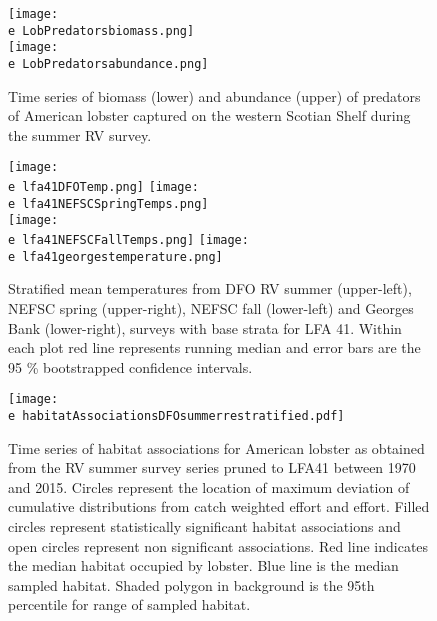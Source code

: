 \documentclass[11pt]{article}
\newcommand{\e}{/backup/bio_data/bio.lobster/figures/} %
\begin{document}

\begin{figure}
\centering
    \texttt{[image: \\e LobPredatorsbiomass.png]}\\
    \texttt{[image: \\e LobPredatorsabundance.png]}\\
    \caption{Time series of biomass (lower) and abundance (upper) of predators of American lobster captured on the western Scotian Shelf during the summer RV survey.}

\end{figure}


\begin{figure}

    \texttt{[image: \\e lfa41DFOTemp.png]}
    \texttt{[image: \\e lfa41NEFSCSpringTemps.png]}\\
    \texttt{[image: \\e lfa41NEFSCFallTemps.png]}
    \texttt{[image: \\e lfa41georgestemperature.png]}\\
   
    \caption{Stratified mean temperatures from DFO RV summer (upper-left), NEFSC spring (upper-right), NEFSC fall (lower-left) and Georges Bank (lower-right), surveys with base strata for LFA 41. Within each plot red line represents running median and error bars are the 95 \% bootstrapped confidence intervals.}

\end{figure}




\begin{figure}

    \texttt{[image: \\e habitatAssociationsDFOsummerrestratified.pdf]}
    \caption{Time series of habitat associations for American lobster as obtained from the RV summer survey series pruned to LFA41 between 1970 and 2015. Circles represent the location of maximum deviation of cumulative distributions from catch weighted effort and effort. Filled circles represent statistically significant habitat associations and open circles represent non significant associations. Red line indicates
the median habitat occupied by lobster. Blue line is the median sampled habitat. Shaded polygon in background is the 95th percentile for range of sampled habitat.}

\end{figure}
\end{document}
